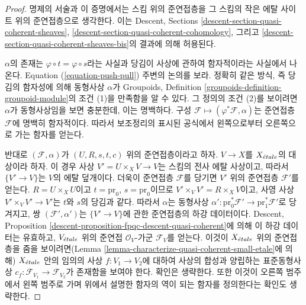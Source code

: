 \begin{proof}
명제의 서술과 이 증명에서는 스킴 위의 준연접층을 그 스킴의 작은 에탈
사이트 위의 준연접층으로 생각한다. 이는 Descent, Sections
\ref{descent-section-quasi-coherent-sheaves},
\ref{descent-section-quasi-coherent-cohomology}, 그리고
\ref{descent-section-quasi-coherent-sheaves-bis}의 결과에 의해 허용된다.

\medskip\noindent
$\alpha$의 존재는 $\varphi \circ t = \varphi \circ s$라는 사실과 당김이
사상에 관하여 함자적이라는 사실에서 나온다. Equation
(\ref{equation-push-pull}) 주변의 논의를 보라. 정확히 같은 방식, 즉
당김의 함자성에 의해 동형사상 $\alpha$가 Groupoids, Definition
\ref{groupoids-definition-groupoid-module}의 조건 (1)을 만족함을 알 수
있다. 그 정의의 조건 (2)를 보이려면 $\alpha$가 동형사상임을 보면
충분한데, 이는 명백하다. 구성
$\mathcal{F} \mapsto (\varphi^*\mathcal{F}, \alpha)$는 준연접층
$\mathcal{F}$에 명백히 함자적이다. 따라서
보조정리의 표시된 공식에서 왼쪽으로부터 오른쪽으로 가는 함자를 얻는다.

\medskip\noindent
반대로 $(\mathcal{F}, \alpha)$가 $(U, R, s, t, c)$ 위의 준연접층이라고
하자. $V \to X$를 $X_{\acute{e}tale}$의 대상이라 하자. 이 경우 사상
$V' = U \times_X V \to V$는 스킴의 전사 에탈 사상이고, 따라서
$\{V' \to V\}$는 $V$의 에탈 덮개이다. 더욱이 준연접층
$\mathcal{F}$를 당기면 $V'$ 위의 준연접층 $\mathcal{F}'$를 얻는다.
$R = U \times_X U$이고 $t = \text{pr}_0$, $s = \text{pr}_0$이므로
$V' \times_V V' = R \times_X V$이고, 사영 사상
$V' \times_V V' \to V'$는 $t$와 $s$의 당김과 같다. 따라서
$\alpha$는 동형사상
$\alpha' : \text{pr}_0^*\mathcal{F}' \to \text{pr}_1^*\mathcal{F}'$로
당겨지고, 쌍 $(\mathcal{F}', \alpha')$는 $\{V' \to V\}$에 관한
준연접층의 하강 데이터이다. Descent, Proposition
\ref{descent-proposition-fpqc-descent-quasi-coherent}에 의해 이 하강
데이터는 유효하고, $V_{\acute{e}tale}$ 위의 준연접 $\mathcal{O}_V$-가군
$\mathcal{F}_V$를 얻는다. 이것이 $X_{\acute{e}tale}$ 위의 준연접층을 줌을
보이려면(Lemma \ref{lemma-characterize-quasi-coherent-small-etale}에 의해)
$X_{\acute{e}tale}$ 안의 임의의 사상 $f : V_1 \to V_2$에 대하여 사상의 합성과
양립하는 표준동형사상
$c_f : \mathcal{F}_{V_1} \to \mathcal{F}_{V_2}$가 존재함을 보여야 한다.
확인은 생략한다. 또한 이것이 오른쪽 범주에서 왼쪽 범주로 가며 위에서
설명한 함자의 역이 되는 함자를 정의한다는 확인도 생략한다.
\end{proof}

